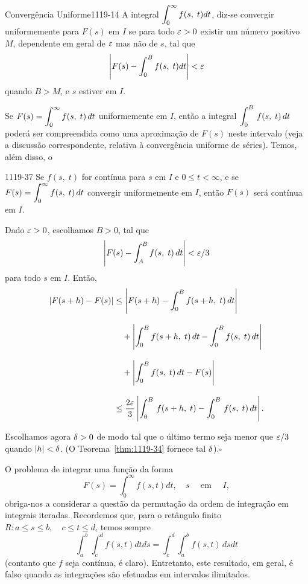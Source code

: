 \begin{defic}{Convergência Uniforme}{1119-14}
A integral $\displaystyle{\int_0^\infty f(s,\; t) dt}$, diz-se convergir
uniformemente para $F(s)$ em $I$ se para todo $\varepsilon > 0$ existir
um número positivo $M$, dependente em geral de $\varepsilon$ mas não de
$s$, tal que
\begin{equation*}
  \left|F(s) - \int^B_0 f(s,\; t) dt\right| < \varepsilon
\end{equation*}
quando $B > M$, e $s$ estiver em $I$.
\end{defic}

Se $\displaystyle{F(s) = \int_0^\infty f(s,\; t)\, dt}$ uniformemente em $I$,
então a integral $\displaystyle{\int_0^B\, f(s,\; t)\, dt}$ poderá ser
compreendida como uma aproximação de $F(s)$ neste intervalo (veja
a discussão correspondente, relativa à convergência uniforme de
séries). Temos, além disso, o

\begin{theoc}{}{1119-37}
Se $f(s,\; t)$ for contínua para $s$ em $I$ e $0 \leq t < \infty$, e
se $\displaystyle{F(s) =\int_0^\infty f(s,\; t)\, dt}$ convergir uniformemente
em $I$, então $F(s)$ será contínua em $I$.
\end{theoc}

\prova Dado $\varepsilon > 0$, escolhamos $B > 0$, tal que
\begin{equation*}
  \left|F(s) - \int^B_A f(s,\; t)\, dt\right| < \varepsilon/3
\end{equation*}
para todo $s$ em $I$. Então,
\begin{align*}
  |F(s+h)-F(s)| & \leq \left|F(s+h) - \int^B_0 f(s+h,\; t)\, dt\right|  \\[2ex]
   &\quad +\left|\int^B_0 f(s+h,\; t)\, dt - \int^B_0 f(s,\; t)\, dt\right| \\[2ex]
   &\quad + \left|\int^B_0 f(s,\; t)\, dt-F(s)\right| \\[2ex]
   &\leq \frac{2\varepsilon}{3}\left|\int_0^B\, f(s+h,\; t)-\int_0^B\, f(s,\; t)\, dt
   \right|.
\end{align*}

Escolhamos agora $\delta> 0$ de modo tal que o último termo seja
menor que $\varepsilon/3$ quando $|h| < \delta$. (O Teorema~\ref{thm:1119-34}
fornece tal $\delta$).\hfill $\square$

O problema de integrar uma função da forma
\begin{equation*}
  F(s)= \int_0^\infty f(s, t)dt, \quad s\quad \text{ em }\quad I,
\end{equation*}
obriga-nos a considerar a questão da permutação da ordem de
integração em integrais iteradas. Recordemos que, para o retângulo
finito $R\colon a \leq s \leq b,\quad c \leq t \leq d$, temos
sempre
\begin{equation*}
  \int_a^b\int_c^d  f(s, t) dt ds =   \int_c^d \int_a^bf(s, t)\, dsdt
\end{equation*}
(contanto que $f$ seja contínua, é claro). Entretanto, este
resultado, em geral, é falso quando as integrações são efetuadas
em intervalos ilimitados.


